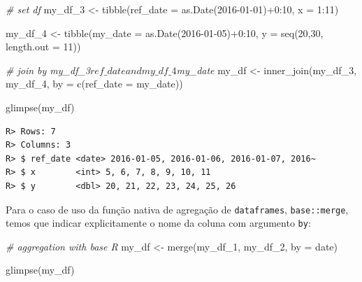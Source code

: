 \documentclass[
  11pt,
]{book}
\newenvironment{Shaded}{\begin{snugshade}}{\end{snugshade}}
\newcommand{\AttributeTok}[1]{\textcolor[rgb]{0.61,0.61,0.61}{#1}}
\newcommand{\CommentTok}[1]{\textcolor[rgb]{0.37,0.37,0.37}{\textit{#1}}}
\newcommand{\DecValTok}[1]{\textcolor[rgb]{0.06,0.06,0.06}{#1}}
\newcommand{\FunctionTok}[1]{\textcolor[rgb]{0,0,0}{#1}}
\newcommand{\NormalTok}[1]{#1}
\newcommand{\OtherTok}[1]{\textcolor[rgb]{0.37,0.37,0.37}{#1}}
\newcommand{\SpecialCharTok}[1]{\textcolor[rgb]{0,0,0}{#1}}
\newcommand{\StringTok}[1]{\textcolor[rgb]{0.5,0.5,0.5}{#1}}
\begin{document}
\begin{Shaded}
\begin{Highlighting}[]
\CommentTok{\# set df}
\NormalTok{my\_df\_3 }\OtherTok{\textless{}{-}} \FunctionTok{tibble}\NormalTok{(}\AttributeTok{ref\_date =} \FunctionTok{as.Date}\NormalTok{(}\StringTok{\textquotesingle{}2016{-}01{-}01\textquotesingle{}}\NormalTok{)}\SpecialCharTok{+}\DecValTok{0}\SpecialCharTok{:}\DecValTok{10}\NormalTok{,}
                  \AttributeTok{x =} \DecValTok{1}\SpecialCharTok{:}\DecValTok{11}\NormalTok{)}

\NormalTok{my\_df\_4 }\OtherTok{\textless{}{-}} \FunctionTok{tibble}\NormalTok{(}\AttributeTok{my\_date =} \FunctionTok{as.Date}\NormalTok{(}\StringTok{\textquotesingle{}2016{-}01{-}05\textquotesingle{}}\NormalTok{)}\SpecialCharTok{+}\DecValTok{0}\SpecialCharTok{:}\DecValTok{10}\NormalTok{,}
                  \AttributeTok{y =} \FunctionTok{seq}\NormalTok{(}\DecValTok{20}\NormalTok{,}\DecValTok{30}\NormalTok{, }\AttributeTok{length.out =} \DecValTok{11}\NormalTok{))}

\CommentTok{\# join by my\_df\_3$ref\_date and my\_df\_4$my\_date}
\NormalTok{my\_df }\OtherTok{\textless{}{-}} \FunctionTok{inner\_join}\NormalTok{(my\_df\_3, my\_df\_4,}
                    \AttributeTok{by =} \FunctionTok{c}\NormalTok{(}\StringTok{\textquotesingle{}ref\_date\textquotesingle{}} \OtherTok{=} \StringTok{\textquotesingle{}my\_date\textquotesingle{}}\NormalTok{))}

\FunctionTok{glimpse}\NormalTok{(my\_df)}
\end{Highlighting}
\end{Shaded}

\begin{verbatim}
R> Rows: 7
R> Columns: 3
R> $ ref_date <date> 2016-01-05, 2016-01-06, 2016-01-07, 2016~
R> $ x        <int> 5, 6, 7, 8, 9, 10, 11
R> $ y        <dbl> 20, 21, 22, 23, 24, 25, 26
\end{verbatim}

Para o caso de uso da função nativa de agregação de \texttt{dataframes}, \texttt{base::merge}, temos que indicar explicitamente o nome da coluna com argumento \texttt{by}: 

\begin{Shaded}
\begin{Highlighting}[]
\CommentTok{\# aggregation with base R}
\NormalTok{my\_df }\OtherTok{\textless{}{-}} \FunctionTok{merge}\NormalTok{(my\_df\_1, my\_df\_2, }\AttributeTok{by =} \StringTok{\textquotesingle{}date\textquotesingle{}}\NormalTok{)}

\FunctionTok{glimpse}\NormalTok{(my\_df)}
\end{Highlighting}
\end{Shaded}
\end{document}
